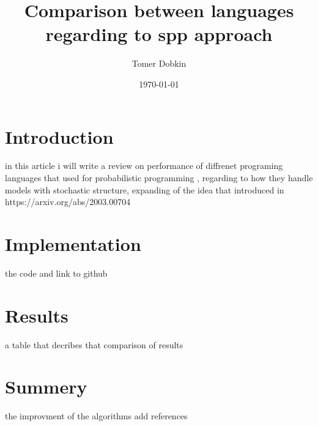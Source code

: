 \documentclass{article}
\title{Comparison between languages regarding to spp approach}
\author{Tomer Dobkin}
\date{\today}
\begin{document}
\maketitle
\section{Introduction}
in this article i will write a review on performance of diffrenet programing languages that used for probabilistic programming , regarding to how they handle models with stochastic structure, expanding of the idea that introduced in https://arxiv.org/abs/2003.00704
\section{Implementation}
the code and link to github
\section{Results}
a table that decribes that comparison of results
\section{Summery}
the improvment of the algorithms
add references
\end{document}
